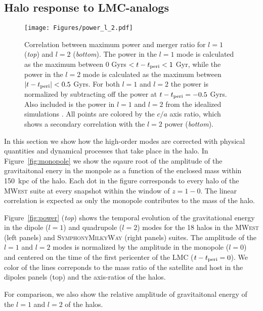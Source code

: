 \documentclass[twocolumn, linenumbers]{openjournal}
\newcommand{\mwest}{\textsc{MWest }}
\newcommand{\symphony}{\textsc{SymphonyMilkyWay }}
\begin{document}
\subsection{Halo response to LMC-analogs}\label{sec:halo_response} 

\begin{figure*}[h]
    \texttt{[image: Figures/power\_l\_2.pdf]}
    \caption[Correlation Between Power and Merger Ratio]{Correlation between maximum power 
    and merger ratio for $l=1$ (\emph{top}) and $l=2$ (\emph{bottom}). The power in the $l=1$ 
    mode is calculated as the maximum between $0$ Gyrs $< t-t_{\rm peri} < 1$ Gyr, while the power 
    in the $l=2$ mode is calculated as the maximum between $|t-t_{\rm peri}| < 0.5$ Gyrs. For both 
    $l=1$ and $l=2$ the power is normalized by subtracting off the power at $t-t_{\rm peri} = -0.5$ 
    Gyrs. Also included is the power in $l=1$ and $l=2$ from the idealized simulations 
    \citep{Garavito_Camargo_2021}. All points are colored by the $c/a$ axis ratio, which shows a 
    secondary correlation with the $l=2$ power (\emph{bottom}).}\label{fig:strength}
\end{figure*}
    

In this section we show how the high-order modes are corrected with physical 
quantities and dynamical processes that take place in the halo. In Figure~\ref{fig:monopole}
we show the sqaure root of the amplitude of the gravitaitonal enery in the 
monpole as a function of the enclosed mass within 150~kpc of the halo. 
Each dot in the figure corresponds to every halo of the \mwest suite at every 
snapshot within the window of $z=1-0$. {\color{Coral3} The linear correlation is 
expected as only the monopole contributes to the mass of the halo}. 

Figure~\ref{fig:power} (\emph{top}) shows the temporal evolution of the gravitational
energy in the dipole ($l=1$) and quadrupole ($l=2$) modes for the 18 halos in the 
\mwest (left panels) and \symphony (right panels) suites. The amplitude of the $l=1$ 
and $l=2$ modes is normalized by the amplitude in the monopole ($l=0$) and centered 
on the time of the first pericenter of the LMC ($t-t_{\rm peri} = 0$). We color of 
the lines correponds to the mass ratio of the satellite and host in the dipoles panels 
(top) and the axis-ratios of the halos.   

For comparison, we also show the relative amplitude of gravitaitonal energy 
of the $l=1$ and $l=2$ of the \cite{Garavito21} halos.  
\end{document}
